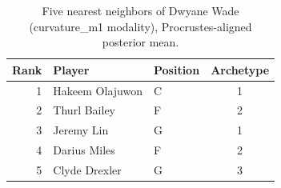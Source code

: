 \begin{table}[htbp]
  \centering\small
  \begin{tabular}{rllc}
    \toprule
    Rank & Player & Position & Archetype \\
    \midrule
    1 & Hakeem Olajuwon & C & 1 \\
    2 & Thurl Bailey & F & 2 \\
    3 & Jeremy Lin & G & 1 \\
    4 & Darius Miles & F & 2 \\
    5 & Clyde Drexler & G & 3 \\
    \bottomrule
  \end{tabular}
  \caption{Five nearest neighbors of Dwyane Wade (curvature_m1 modality), Procrustes-aligned posterior mean.}
  \label{tab:Dwyane_Wade_neighbors_curvature_m1}
\end{table}

